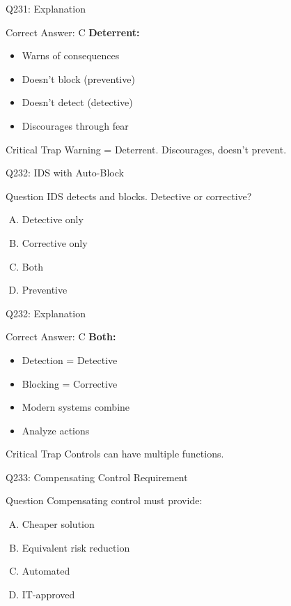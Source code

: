 \documentclass{beamer}
\begin{document}
	\begin{frame}{Q231: Explanation}
		\begin{block}{Correct Answer: C}
			\textbf{Deterrent:}
			\begin{itemize}
				\item Warns of consequences
				\item Doesn't block (preventive)
				\item Doesn't detect (detective)
				\item Discourages through fear
			\end{itemize}
		\end{block}
		\begin{alertblock}{Critical Trap}
			Warning = Deterrent.
			Discourages, doesn't prevent.
		\end{alertblock}
	\end{frame}
	
	\begin{frame}{Q232: IDS with Auto-Block}
		\begin{block}{Question}
			IDS detects and blocks. Detective or corrective?
		\end{block}
		\begin{enumerate}[(A)]
			\item Detective only
			\item Corrective only
			\item Both
			\item Preventive
		\end{enumerate}
	\end{frame}
	
	\begin{frame}{Q232: Explanation}
		\begin{block}{Correct Answer: C}
			\textbf{Both:}
			\begin{itemize}
				\item Detection = Detective
				\item Blocking = Corrective
				\item Modern systems combine
				\item Analyze actions
			\end{itemize}
		\end{block}
		\begin{alertblock}{Critical Trap}
			Controls can have multiple functions.
		\end{alertblock}
	\end{frame}
	
	\begin{frame}{Q233: Compensating Control Requirement}
		\begin{block}{Question}
			Compensating control must provide:
		\end{block}
		\begin{enumerate}[(A)]
			\item Cheaper solution
			\item Equivalent risk reduction
			\item Automated
			\item IT-approved
		\end{enumerate}
	\end{frame}
	
\end{document}
